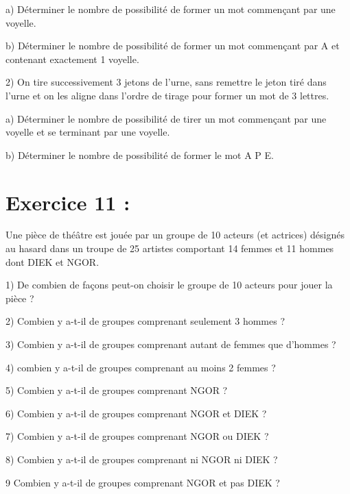 \documentclass[12pt]{article}
\begin{document}
 a) Déterminer le nombre de possibilité de former un mot commençant par une voyelle.
 
 b) Déterminer le nombre de possibilité de former un mot commençant par A  et contenant exactement 1 voyelle.
 
2) On tire successivement 3 jetons de l’urne, sans remettre le jeton tiré dans l’urne et on les aligne dans l’ordre de tirage pour former un mot de 3 lettres.

 a) Déterminer le nombre de possibilité de tirer un mot commençant par une voyelle et se terminant par une  voyelle.
 
 b) Déterminer le nombre de possibilité de former le mot A P E. 
\section*{Exercice 11 :}
Une pièce de théâtre est jouée par un groupe de 10 acteurs (et actrices) désignés au hasard dans un troupe de 25 artistes comportant 14 femmes et 11 hommes dont DIEK et NGOR.

1) De combien de façons peut-on choisir le groupe de 10 acteurs pour jouer la pièce ?

2) Combien y a-t-il de groupes comprenant seulement 3 hommes ? 

3) Combien y a-t-il de groupes comprenant autant de femmes que d’hommes ?

4) combien y a-t-il de groupes comprenant au moins 2 femmes ?

5) Combien y a-t-il de groupes comprenant NGOR ?

6) Combien y a-t-il de groupes comprenant NGOR et DIEK ?

7) Combien y a-t-il de groupes comprenant NGOR ou DIEK ?

8)  Combien y a-t-il de groupes comprenant ni NGOR ni DIEK ?      

9   Combien y a-t-il de groupes comprenant NGOR et pas DIEK ?                                                                                                                                     
\end{document}

